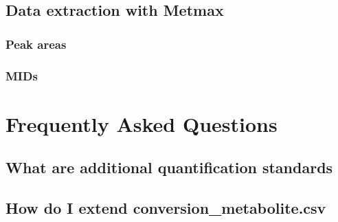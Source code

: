 \documentclass[]{book}
\theoremstyle{definition}
\theoremstyle{definition}
\theoremstyle{definition}
\theoremstyle{remark}
\begin{document}
\section{Data extraction with Metmax}\label{data-extraction-with-metmax}

\subsection{Peak areas}\label{peak-areas}

\subsection{MIDs}\label{mids}

\chapter{Frequently Asked Questions}\label{FAQ}

\section{What are additional quantification
standards}\label{what-are-additional-quantification-standards}

\section{How do I extend
conversion\_metabolite.csv}\label{how-do-i-extend-conversion_metabolite.csv}


\end{document}
